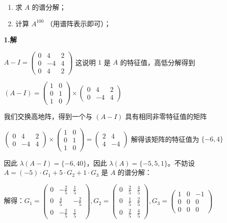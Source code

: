 \documentclass{article}
\begin{document}
\begin{enumerate}
	\item 求 $A$ 的谱分解；
	\item 计算 $A^{100}$ （用谱阵表示即可）；
\end{enumerate}

\par \textbf{1.解}

$A-I=\begin{pmatrix}
	0 & 4 & 2\\
	0 & -4 & 4\\
	0 & 4 & 2
\end{pmatrix}$ 这说明 $1$ 是 $A$ 的特征值，高低分解得到

$(A-I)=\begin{pmatrix}
	1 & 0\\
	0 & 1\\
	1 & 0
\end{pmatrix} \times \begin{pmatrix}
	0 & 4 & 2\\
	0 & -4 & 4
\end{pmatrix}$

我们交换高地阵，得到一个与 $(A-I)$ 具有相同非零特征值的矩阵

$ \begin{pmatrix}
	0 & 4 & 2\\
	0 & -4 & 4
\end{pmatrix}\times \begin{pmatrix}
1 & 0\\
0 & 1\\
1 & 0
\end{pmatrix}=\begin{pmatrix}
	2 & 4 \\
	4 & -4
\end{pmatrix}$ 解得该矩阵的特征值为 $\{-6, 4\}$

因此 $\lambda(A-I)=\{-6, 4 0\}$，因此 $\lambda(A)=\{-5, 5, 1\}$。不妨设 $A=(-5)\cdot G_1 + 5\cdot G_2 + 1\cdot G_3$ 是 $A$ 的谱分解：

解得：$G_1=\begin{pmatrix}
	0 & -\frac{2}{5} & \frac{1}{5}\\
	0 & \frac{4}{5} & -\frac{2}{5}\\
	0 & -\frac{2}{5} & \frac{1}{5}
\end{pmatrix}, G_2=\begin{pmatrix}
	0 & \frac{2}{5} & \frac{4}{5}\\
	0 & \frac{1}{5} & \frac{2}{5}\\
	0 & \frac{2}{5} & \frac{4}{5}
\end{pmatrix}, G_3=\begin{pmatrix}
	1 & 0 & -1\\
	0 & 0 & 0\\
	0 & 0 & 0
\end{pmatrix}$
\end{document}
